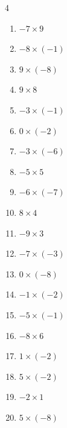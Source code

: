 \begin{multicols}{4}
\begin{enumerate}
  \item $-7\times 9$
        \phantom{$=-63$}

  \item $-8\times (-1)$
        \phantom{$=8$}

  \item $9\times (-8)$
        \phantom{$=-72$}

  \item $9\times 8$
        \phantom{$=72$}

  \item $-3\times (-1)$
        \phantom{$=3$}

  \item $0\times (-2)$
        \phantom{$=0$}

  \item $-3\times (-6)$
        \phantom{$=18$}

  \item $-5\times 5$
        \phantom{$=-25$}

  \item $-6\times (-7)$
        \phantom{$=42$}

  \item $8\times 4$
        \phantom{$=32$}

  \item $-9\times 3$
        \phantom{$=-27$}

  \item $-7\times (-3)$
        \phantom{$=21$}

  \item $0\times (-8)$
        \phantom{$=0$}

  \item $-1\times (-2)$
        \phantom{$=2$}

  \item $-5\times (-1)$
        \phantom{$=5$}

  \item $-8\times 6$
        \phantom{$=-48$}

  \item $1\times (-2)$
        \phantom{$=-2$}

  \item $5\times (-2)$
        \phantom{$=-10$}

  \item $-2\times 1$
        \phantom{$=-2$}

  \item $5\times (-8)$
        \phantom{$=-40$}

\columnbreak %


\end{enumerate}
\end{multicols}

